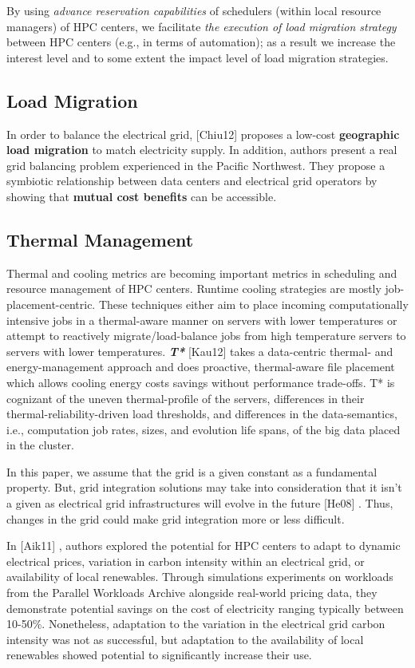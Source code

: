 \documentclass{llncs}
\begin{document}
By using \textit{advance reservation capabilities }of schedulers 
(within local resource managers) of HPC centers, we
facilitate \textit{the execution of load migration strategy }between 
HPC centers (e.g., in terms of automation); as a result
we increase the interest level and to some extent the impact level of load
migration strategies.

\subsection{Load Migration}

In order to balance the electrical grid, [Chiu12] proposes a low-cost
\textbf{geographic load migration} to match electricity supply. In addition,
authors present a real grid balancing problem experienced in the Pacific
Northwest. They propose a symbiotic relationship between data centers and
electrical grid operators by showing that \textbf{mutual cost benefits }can
be accessible.

\subsection{Thermal Management}
Thermal and cooling metrics are becoming important metrics in scheduling and
resource management of HPC centers. Runtime cooling strategies are mostly
job-placement-centric. These techniques either aim to place incoming
computationally intensive jobs in a thermal-aware manner on servers with
lower temperatures or attempt to reactively migrate/load-balance jobs from
high temperature servers to servers with lower temperatures.
\textbf{\textit{T* }} [Kau12]
 takes a data-centric thermal- and
energy-management approach and does proactive, thermal-aware file placement
which allows cooling energy costs savings without performance trade-offs. T*
is cognizant of the uneven thermal-profile of the servers, differences in
their thermal-reliability-driven load thresholds, and differences in the
data-semantics, i.e., computation job rates, sizes, and evolution life
spans, of the big data placed in the cluster.

In this paper, we assume that the grid is a given constant as a fundamental
property. But, grid integration solutions may take into consideration that
it isn't a given as electrical grid infrastructures will evolve in the
future [He08]
. Thus, changes in the grid could make grid integration more or
less difficult.

In [Aik11] , authors explored the potential for HPC centers to adapt to
dynamic electrical prices, variation in carbon intensity within an
electrical grid, or availability of local renewables. Through simulations
experiments on workloads from the Parallel Workloads Archive alongside
real-world pricing data, they demonstrate potential savings on the cost of
electricity ranging typically between 10-50{\%}. Nonetheless, adaptation to
the variation in the electrical grid carbon intensity was not as successful,
but adaptation to the availability of local renewables showed potential to
significantly increase their use.
\end{document}
